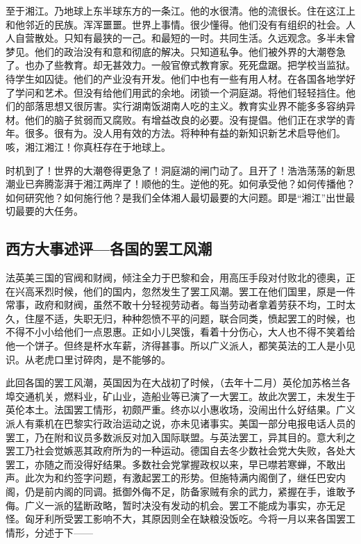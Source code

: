 至于湘江。乃地球上东半球东方的一条江。他的水很清。他的流很长。住在这江上和他邻近的民族。浑浑噩噩。世界上事情。很少懂得。他们没有有组织的社会。人人自营散处。只知有最狭的一己。和最短的一时。共同生活。久远观念。多半未曾梦见。他们的政治没有和意和彻底的解决。只知道私争。他们被外界的大潮卷急了。也办了些教育。却无甚效力。一般官僚式教育家。死死盘踞。把学校当监狱。待学生如囚徒。他们的产业没有开发。他们中也有一些有用人材。在各国各地学好了学问和艺术。但没有给他们用武的余地。闭锁一个洞庭湖。将他们轻轻挡住。他们的部落思想又很厉害。实行湖南饭湖南人吃的主义。教育实业界不能多多容纳异材。他们的脑子贫弱而又腐败。有增益改良的必要。没有提倡。他们正在求学的青年。很多。很有为。没人用有效的方法。将种种有益的新知识新艺术启导他们。咳，湘江湘江！你真枉存在于地球上。

时机到了！世界的大潮卷得更急了！洞庭湖的闸门动了。且开了！浩浩荡荡的新思潮业已奔腾澎湃于湘江两岸了！顺他的生。逆他的死。如何承受他？如何传播他？如何研究他？如何施行他？是我们全体湘人最切最要的大问题。即是“湘江”出世最切最要的大任务。

\subsection{西方大事述评—各国的罢工风潮}

法英美三国的官阀和财阀，倾注全力于巴黎和会，用高压手段对付败北的德奥，正在兴高釆烈时候，他们的国内，忽然发生了罢工风潮。罢工在他们国里，原是一件常事，政府和财阀，虽然不敢十分轻视劳动者。每当劳动者拿着劳获不均，工时太久，住屋不适，失职无归，种种怨愤不平的问题，联合同类，愤起罢工的时候，也不得不小小给他们一点恩惠。正如小儿哭饿，看着十分伤心，大人也不得不笑着给他一个饼子。但终是杯水车薪，济得甚事。所以广义派人，都笑英法的工人是小见识。从老虎口里讨碎肉，是不能够的。

此回各国的罢工风潮，英国因为在大战初了时候，（去年十二月）英伦加苏格兰各埠交通机关，燃料业，矿山业，造船业等已演了一大罢工。故此次罢工，未发生于英伦本土。法国罢工情形，初颇严重。终亦以小惠收场，没闹出什么好结果。广义派人有乘机在巴黎实行政治运动之说，亦未见诸事实。美国一部分电报电话人员的罢工，乃在附和议员多数派反对加入国际联盟。与英法罢工，异其目的。意大利之罢工乃社会觉嫉恶其政府所为的一种运动。德国自去冬少数社会党大失败，各处大罢工，亦随之而没得好结果。多数社会党掌握政权以来，早已噤若寒蝉，不敢出声。此次为和约签字问题，有激起罢工的形势。但施特满内阁倒了，继任巴安内阁，仍是前内阁的同调。抵御外侮不足，防备家贼有余的武力，紧握在手，谁敢予侮。广义一派的猛断政略，暂时决没有发动的机会。罢工不能成为事实，亦无足怪。匈牙利所受罢工影响不大，其原因则全在缺粮没饭吃。今将一月以来各国罢工情形，分述于下——

